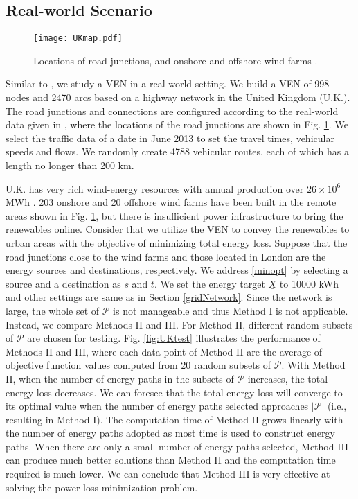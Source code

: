 \documentclass[journal]{IEEEtran}
\begin{document}
\subsection{Real-world Scenario}

\begin{figure}[!t]
\centering
\texttt{[image: UKmap.pdf]} 
\caption{Locations of road junctions, and onshore and offshore wind farms \cite{VEN}.}
\label{fig:UKmap}
\end{figure}

Similar to \cite{VEN}, we study a VEN in a real-world setting. We build a VEN of 998 nodes and 2470 arcs based on  a highway network in the United Kingdom (U.K.). The road junctions and connections are configured according to the real-world data given in  \cite{ukroads}, where the locations of the road junctions are shown in Fig. \ref{fig:UKmap}. We select the traffic data of a date in June 2013 to set the travel times, vehicular speeds and flows. We randomly create 4788 vehicular routes, each of which  has a length no longer than 200 km.

U.K. has very rich wind-energy resources with annual production over $26\times 10^6$ MWh \cite{UKWindDB}. 203 onshore and 20 offshore wind farms have been built in the remote areas \cite{onshore,offshore} shown in Fig. \ref{fig:UKmap}, but there is   insufficient power infrastructure to bring the renewables online. Consider that we utilize the VEN to convey the renewables to urban areas with the objective of minimizing total energy loss. Suppose that the road junctions close to the wind farms and those located in London are the energy sources and destinations, respectively. We address \eqref{minopt} by selecting a source and a destination as $s$ and $t$. We set the energy target $\underline{X}$ to 10000 kWh and other settings are same as in  Section \ref{gridNetwork}.
Since the network is large, the whole set of $\mathcal{P}$ is not manageable and thus Method I is not applicable. Instead, we compare Methods II and III. For Method II, different random subsets of $\mathcal{P}$ are chosen for testing. Fig. \ref{fig:UKtest} illustrates the performance of Methods II and III, where each data point of Method II are the average of objective function values computed from 20 random subsets of $\mathcal{P}$.
With Method II, when the number of energy paths in the subsets of $\mathcal{P}$ increases, the total energy loss decreases. We can foresee that the total energy loss will converge to its optimal value when the number of energy paths selected approaches $|\mathcal{P}|$ (i.e., resulting in Method I). The computation time of Method II grows linearly with the number of energy paths adopted as most time is used to construct energy paths. When there are only a small number of energy paths selected, Method III can produce much better solutions than Method II and the computation time required is much lower. We can conclude that Method III is very effective at solving the power loss minimization problem.
\end{document}
